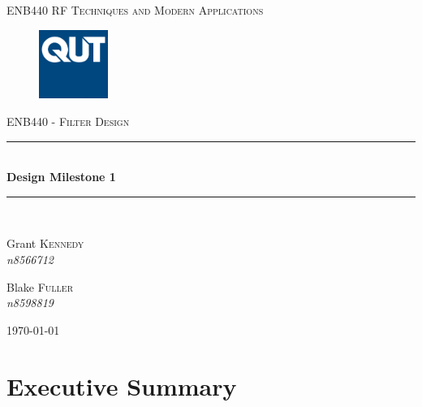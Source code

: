 \documentclass{paper}
\newcommand{\HRule}{\rule{\linewidth}{0.5mm}}
\begin{document}
\newpage
\begin{titlepage}
\begin{center}

\textsc{\LARGE ENB440 RF Techniques and Modern Applications}\\[0.75cm]

\begin{figure}[H]
\centering
\includegraphics[width=0.2\textwidth]{IMG/QUT} \\[0.75cm]
\end{figure}

\textsc{\Large ENB440 - Filter Design}\\[0.5cm]

\HRule \\[0.4cm]
{ \huge \bfseries Design Milestone 1 \\[0.4cm] }

\HRule \\[1.5cm]



\begin{minipage}{0.4\textwidth}
\begin{flushleft} \large
Grant \textsc{Kennedy} \\
\emph{n8566712}\\
\end{flushleft}
\end{minipage}
\begin{minipage}{0.4\textwidth}
\begin{flushright} \large
Blake \textsc{Fuller} \\
\emph{n8598819}\\
\end{flushright}
\end{minipage}

\vfill

{\large \today}
\end{center}
\end{titlepage}

\section{Executive Summary}


\newpage
\tableofcontents
\end{document}
